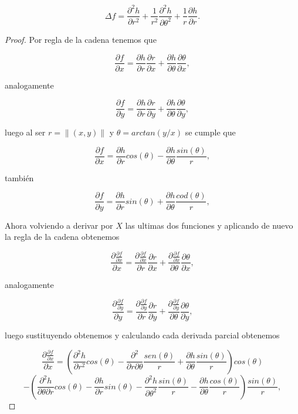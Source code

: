\documentclass[letterpaper]{article}
\theoremstyle{definition}
\theoremstyle{lemathm}
\theoremstyle{lemathm}
\theoremstyle{lemademthm}
\newcommand{\pars}[1]{\left( #1 \right) }
\newcommand{\norm}[1]{\left\lVert#1\right\rVert}
\newcommand{\1}{\mathbbm{1}}
\begin{document}
\begin{enumerate}
		\[\Delta f = \frac{\partial^2 h}{\partial r^2} + \frac{1}{r^2}\frac{\partial^2 h}{\partial \theta^2} + \frac{1}{r}\frac{\partial h}{\partial r}.\]

		\begin{proof}
			Por regla de la cadena tenemos que

			\[\frac{\partial f}{\partial x} = \frac{\partial h}{\partial r}\frac{\partial r}{\partial x} + \frac{\partial h}{\partial \theta}\frac{\partial \theta}{\partial x},\]

			analogamente

			\[\frac{\partial f}{\partial y} = \frac{\partial h}{\partial r}\frac{\partial r}{\partial y} + \frac{\partial h}{\partial \theta}\frac{\partial \theta}{\partial y},\]

			luego al ser $r = \norm{(x,y)}$ y $\theta = arctan(y/x)$ se cumple que

			\[\frac{\partial f}{\partial x} = \frac{\partial h}{\partial r}cos(\theta) - \frac{\partial h}{\partial \theta}\frac{sin(\theta)}{r},\]

			también

			\[\frac{\partial f}{\partial y} = \frac{\partial h}{\partial r}sin(\theta) + \frac{\partial h}{\partial \theta}\frac{cod(\theta)}{r},\]

			Ahora volviendo a derivar por $X$ las ultimas dos funciones y aplicando de nuevo la regla de la cadena obtenemos

			\[\frac{\partial \frac{\partial f}{\partial x}}{\partial x} = \frac{\partial \frac{\partial f}{\partial x}}{\partial r}\frac{\partial r}{\partial x} + \frac{\partial \frac{\partial f}{\partial x}}{\partial \theta}\frac{\partial \theta}{\partial x},\]

			analogamente

			\[\frac{\partial \frac{\partial f}{\partial y}}{\partial y} = \frac{\partial \frac{\partial f}{\partial y}}{\partial r}\frac{\partial r}{\partial y} + \frac{\partial \frac{\partial f}{\partial y}}{\partial \theta}\frac{\partial \theta}{\partial y},\]

			luego sustituyendo obtenemos y calculando cada derivada parcial obtenemos

			\[\frac{\partial \frac{\partial f}{\partial x}}{\partial x} = \pars{\frac{\partial^2 h}{\partial r^2}cos(\theta) - \frac{\partial^2}{\partial r\partial \theta}\frac{sen(\theta)}{r} + \frac{\partial h}{\partial \theta} \frac{sin(\theta)}{r}}cos(\theta)\]\[ - \pars{\frac{\partial^2 h}{\partial \theta \partial r}cos(\theta) - \frac{\partial h}{\partial r}sin(\theta) - \frac{\partial^2 h}{\partial \theta^2}\frac{sin(\theta)}{r} - \frac{\partial h}{\partial \theta}\frac{cos(\theta)}{r}}\frac{sin(\theta)}{r},\]


\end{proof}
\end{enumerate}
\end{document}
